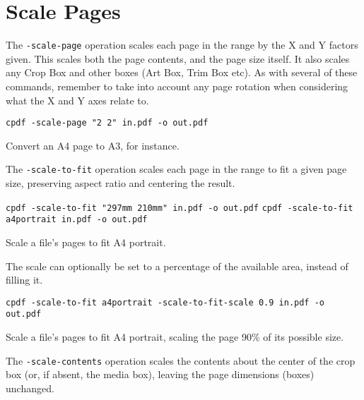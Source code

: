 \documentclass{book}
\begin{document}
  \section{Scale Pages}
  The \texttt{-scale-page} operation scales each page in the range by the X and
Y factors given. This scales both the page contents, and the page size itself. It also scales any Crop Box and other boxes (Art Box, Trim Box etc). As with several of these commands, remember to take into account any page rotation when considering what the X and Y axes relate to.

  \begin{framed}
  \small\noindent\verb!cpdf -scale-page "2 2" in.pdf -o out.pdf!

  \vspace{2.5mm}
  \noindent Convert an A4 page to A3, for instance.
  \end{framed}

  \noindent The \texttt{-scale-to-fit} operation scales each page in the range to fit a
  given page size, preserving aspect ratio and centering the result.

  \begin{framed}
  \small\noindent\verb!cpdf -scale-to-fit "297mm 210mm" in.pdf -o out.pdf!
  \small\noindent\verb!cpdf -scale-to-fit a4portrait in.pdf -o out.pdf!

  \vspace{2.5mm}
  \noindent Scale a file's pages to fit A4 portrait.
  \end{framed}

  \noindent The scale can optionally be set to a percentage of the available area, instead of filling it.
  \begin{framed}
  \small\noindent\verb!cpdf -scale-to-fit a4portrait -scale-to-fit-scale 0.9 in.pdf -o out.pdf!

  \vspace{2.5mm}
  \noindent Scale a file's pages to fit A4 portrait, scaling the page 90\% of its possible size.
  \end{framed}

  \noindent The \texttt{-scale-contents} operation scales the contents about the center
  of the crop box (or, if absent, the media box), leaving the page dimensions
  (boxes) unchanged.
\end{document}
